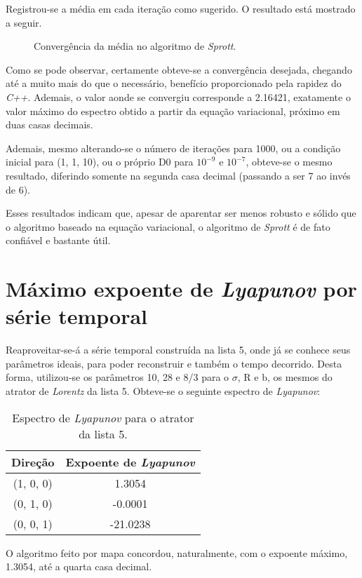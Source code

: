 \documentclass{article}[twocolumn]
\begin{document}
	Registrou-se a m\'edia em cada itera\c{c}\~ao como sugerido. O resultado est\'a mostrado
	a seguir.
	\begin{figure}[H]
		\centering
		\caption{Converg\^encia da m\'edia no algoritmo de \textit{Sprott}.}
	\end{figure}
	Como se pode observar, certamente obteve-se a converg\^encia desejada, chegando at\'e a
	muito mais do que o necess\'ario, benef\'icio proporcionado pela rapidez do \textit{C++}.
	Ademais, o valor aonde se convergiu corresponde a 2.16421, exatamente o valor m\'aximo
	do espectro obtido a partir da equa\c{c}\~ao variacional, pr\'oximo em duas casas
	decimais.

	Ademais, mesmo alterando-se o n\'umero de itera\c{c}\~oes para 1000, ou a condi\c{c}\~ao
	inicial para (1, 1, 10), ou o pr\'oprio D0 para $10^{-9}$ e $10^{-7}$, obteve-se o mesmo
	resultado, diferindo somente na segunda casa decimal (passando a ser 7 ao inv\'es de 6).

	Esses resultados indicam que, apesar de aparentar ser menos robusto e s\'olido que o
	algoritmo baseado na equa\c{c}\~ao variacional, o algoritmo de \textit{Sprott} \'e de fato
	confi\'avel e bastante \'util.
	\section{M\'aximo expoente de \textit{Lyapunov} por s\'erie temporal}
	Reaproveitar-se-\'a a s\'erie temporal constru\'ida na lista 5, onde j\'a se conhece seus
	par\^ametros ideais, para poder reconstruir e tamb\'em o tempo decorrido. Desta forma,
	utilizou-se os par\^ametros 10, 28 e 8/3 para o $\sigma$, R e b, os mesmos do atrator de
	\textit{Lorentz} da lista 5. Obteve-se o seguinte espectro de \textit{Lyapunov}:
	\begin{table}[H]
		\centering
		\begin{tabular}{cc}
			\hline
			Dire\c{c}\~ao & Expoente de \textit{Lyapunov}\\
			\hline
			(1, 0, 0) &  1.3054\\
			(0, 1, 0) & -0.0001\\
			(0, 0, 1) & -21.0238\\
			\hline
		\end{tabular}
		\caption{Espectro de \textit{Lyapunov} para o atrator da lista 5.}
	\end{table}
	O algoritmo feito por mapa concordou, naturalmente, com o expoente m\'aximo, 1.3054, at\'e
	a quarta casa decimal.
\end{document}
